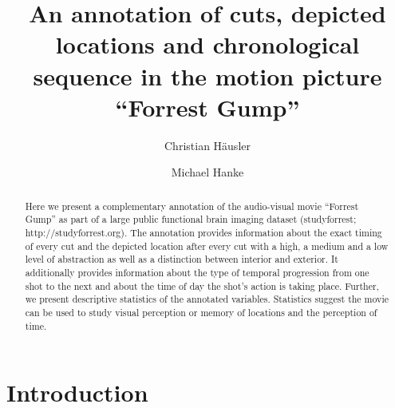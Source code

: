 \documentclass[10pt,a4paper,twocolumn]{article}
\begin{document}


\title{An annotation of cuts, depicted locations and chronological sequence in the motion
	picture ``Forrest Gump''}

\author[1]{Christian Häusler}
\author[1,2]{Michael Hanke}

\maketitle
\thispagestyle{fancy}

\begin{abstract}
Here we present a complementary annotation of the audio-visual movie ``Forrest
Gump'' as part of a large public functional brain imaging dataset
(studyforrest; http://studyforrest.org). The annotation provides information
about the exact timing of every cut and the depicted location after every
cut with a high, a medium and a low level of abstraction as well as a
distinction between interior and exterior. It additionally provides
information about the type of temporal progression from one shot to the
next and about the time of day the shot’s action is taking place.
Further, we present descriptive statistics of the annotated variables.
Statistics suggest the movie can be used to study visual perception or memory
of locations and the perception of time.

\end{abstract}


\clearpage


\section*{Introduction}
\end{document}
